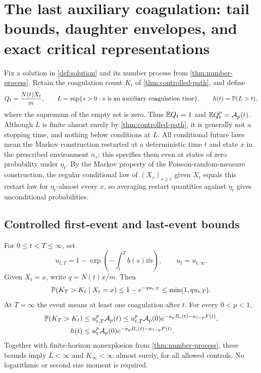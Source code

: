 \section{The last auxiliary coagulation: tail bounds, daughter envelopes,
and exact critical representations}
\label{sec:last-event}

Fix a solution in \cref{def:solution} and its number process from
\cref{thm:number-process}. Retain the coagulation count $K_t$ of
\cref{thm:controlled-path}, and define
\begin{equation}
 Q_t=\frac{N(t)X_t}{m},\qquad
 L=\sup\{s>0:s\text{ is an auxiliary coagulation time}\},\qquad
 h(t)=\mathbb P(L>t),
 \label{eq:last-event-def}
\end{equation}
where the supremum of the empty set is zero. Thus $\mathbb E Q_t=1$ and
$\mathbb E Q_t^p=\mathcal A_p(t)$. Although $L$ is finite almost surely by
\cref{thm:controlled-path}, it is generally not a stopping time, and
nothing below conditions at $L$. All conditional future laws mean the
Markov construction restarted at a deterministic time $t$ and state
$x$ in the prescribed environment $n_s$; this specifies them even at
states of zero probability under $\eta_t$. By the Markov property of
the Poisson-random-measure construction, the regular conditional law
of $(X_s)_{s\geq t}$ given $X_t$ equals this restart law for
$\eta_t$-almost every $x$, so averaging restart quantities against
$\eta_t$ gives unconditional probabilities.

\subsection{Controlled first-event and last-event bounds}

\begin{theorem}
\label{thm:last-controlled}
For $0\leq t<T\leq\infty$, set
\begin{equation}
 u_{t,T}=1-\exp\left(-\int_t^T b(s)\dd s\right),\qquad
 u_t=u_{t,\infty}.
 \label{eq:remaining-activity}
\end{equation}
Given $X_t=x$, write $q=N(t)x/m$. Then
\begin{equation}
 \mathbb P(K_T>K_t\mid X_t=x)
 \leq1-e^{-q u_{t,T}}\leq\min(1,q u_{t,T}).
 \label{eq:first-event-bound}
\end{equation}
At $T=\infty$ the event means at least one coagulation after $t$.
For every $0<p<1$,
\begin{align}
 \mathbb P(K_T>K_t)
 &\leq u_{t,T}^p\mathcal A_p(t)
 \leq u_{t,T}^p\mathcal A_p(0)
       e^{-a_pB_{\mathrm c}(t)-a_{1-p}F(t)},\label{eq:window-tail}\\
 h(t)&\leq u_t^p\mathcal A_p(0)
       e^{-a_pB_{\mathrm c}(t)-a_{1-p}F(t)}.\label{eq:last-tail}
\end{align}
Together with finite-horizon nonexplosion from
\cref{thm:number-process}, these bounds imply $L<\infty$ and
$K_\infty<\infty$ almost surely, for all allowed controls. No
logarithmic or second size moment is required.
\end{theorem}

